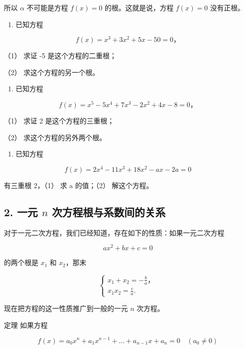 所以 \(\alpha\) 不可能是方程 \(f(x) = 0\) 的根。这就是说，方程
\(f(x) = 0\) 没有正根。

\begin{enumerate}[start=2]
\item
  已知方程
\end{enumerate}

\[
f (x) = x ^ {3} + 3 x ^ {2} + 5 x - 50 = 0\text{，}
\]

（1） 求证 -5 是这个方程的二重根；

（2） 求这个方程的另一个根。

\begin{enumerate}[start=3]
\item
  已知方程
\end{enumerate}

\[
f (x) = x ^ {5} - 5 x ^ {4} + 7 x ^ {3} - 2 x ^ {2} + 4 x - 8 = 0\text{，}
\]

（1） 求证 2 是这个方程的三重根；

（2） 求这个方程的另外两个根。

\begin{enumerate}[start=4]
\item
  已知方程
\end{enumerate}

\[
f (x) = 2 x ^ {4} - 11 x ^ {3} + 18 x ^ {2} - a x - 2 a = 0
\]

有三重根 2，（1） 求 a 的值；（2） 解这个方程。

\subsection{\texorpdfstring{2. 一元 \(n\) 次方程根与系数间的关系}{2. 一元 n 次方程根与系数间的关系}}

对于一元二次方程，我们已经知道，存在如下的性质：如果一元二次方程

\[
a x ^ {2} + b x + c = 0
\]

的两个根是 \(x_{1}\) 和 \(x_{2}\)，那末

\[
\left\{ \begin{array}{c} x _ {1} + x _ {2} = - \frac {b}{a}\text{，} \\ x _ {1} x _ {2} = \frac {c}{a}. \end{array} \right.
\]

现在把方程的这一性质推广到一般的一元 \(n\) 次方程。

定理 如果方程

\[
f (x) = a _ {0} x ^ {n} + a _ {1} x ^ {n - 1} + \dots + a _ {n - 1} x + a _ {n} = 0 \quad (a _ {0} \neq 0)
\]


